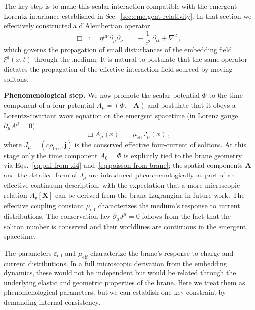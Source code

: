 The key step is to make this scalar interaction compatible with the
emergent Lorentz invariance established in
Sec.~\ref{sec:emergent-relativity}. In that section we effectively
constructed a d'Alembertian operator
\begin{equation}
  \Box
  \;:=\;
  \eta^{\mu\nu}\,\partial_\mu\partial_\nu
  \;=\;
  -\frac{1}{c^2}\,\partial_{tt} + \nabla^2\,,
  \label{eq:brane-dalembert}
\end{equation}
which governs the propagation of small disturbances of the embedding
field $\xi^a(x,t)$ through the medium.
It is natural to postulate that the same operator dictates the
propagation of the effective interaction field sourced by moving
solitons.

\textbf{Phenomenological step.}
We now promote the scalar potential $\Phi$ to the time component
of a four-potential $A_\mu = (\Phi, -\mathbf{A})$ and postulate that
it obeys a Lorentz-covariant wave equation on the emergent spacetime
(in Lorenz gauge $\partial_\mu A^\mu = 0$),
\begin{equation}
  \Box A_\mu(x)
  \;=\;
  \mu_{\mathrm{eff}}\,J_\mu(x)\,,
  \label{eq:maxwell-wave}
\end{equation}
where $J_\mu = (c\rho_{\text{free}},\mathbf{j})$ is the conserved
effective four-current of solitons. At this stage only the time
component $A_0=\Phi$ is explicitly tied to the brane geometry via
Eqs.~\eqref{eq:phi-from-xi4} and~\eqref{eq:poisson-from-brane}; the
spatial components $\mathbf{A}$ and the detailed form of $J_\mu$ are
introduced phenomenologically as part of an effective continuum
description, with the expectation that a more microscopic relation
$A_\mu[\mathbf{X}]$ can be derived from the brane Lagrangian in future
work. The effective coupling constant $\mu_{\mathrm{eff}}$ characterizes
the medium's response to current distributions.
The conservation law
$\partial_\mu J^\mu = 0$ follows from the fact that the soliton number
is conserved and their worldlines are continuous in the emergent
spacetime.

The parameters $\varepsilon_{\mathrm{eff}}$ and $\mu_{\mathrm{eff}}$
characterize the brane's response to charge and current distributions.
In a full microscopic derivation from the embedding dynamics, these
would not be independent but would be related through the underlying
elastic and geometric properties of the brane. Here we treat them as
phenomenological parameters, but we can establish one key constraint
by demanding internal consistency.

